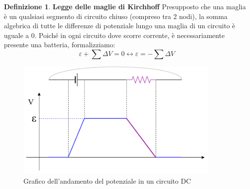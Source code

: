 \documentclass[a3paper, twoside, openany]{book}
\theoremstyle{definition}
\newtheorem{definition}{Definizione}
\begin{document}
\begin{definition}{\textbf{Legge delle maglie di Kirchhoff}}
Presupposto che una maglia è un qualsiasi segmento di circuito chiuso (compreso tra 2 nodi), la somma algebrica di tutte le differenze di potenziale lungo una maglia di un circuito è uguale a 0. Poiché in ogni circuito dove scorre corrente, è necessariamente presente una batteria, formalizziamo: $$\varepsilon+\sum{\Delta V}=0\longleftrightarrow \varepsilon=-\sum{\Delta V}$$
\end{definition}
\begin{figure}[htp]
    \centering
    \includegraphics[width=10cm]{Circuito RC-Maglia}
    \caption{Grafico dell'andamento del potenziale in un circuito DC}
    \label{fig:maglia}
\end{figure} \clearpage
\end{document}
